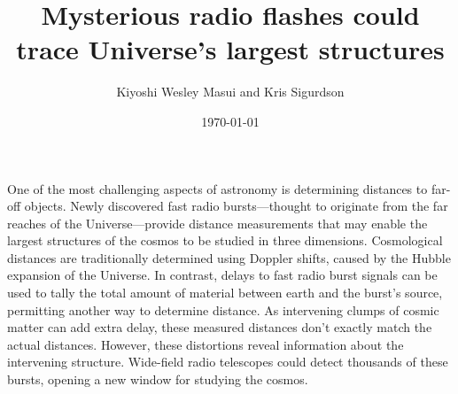 \documentclass{article}
\title{Mysterious radio flashes could trace Universe's largest
structures}
\date{\today}
\author{Kiyoshi Wesley Masui and Kris Sigurdson}
\begin{document}
\maketitle

One of the most challenging aspects of astronomy is determining distances to
far-off objects. Newly discovered fast radio bursts---thought to originate from
the far reaches of the Universe---provide distance measurements that may
enable the largest structures of the cosmos to be studied in three dimensions.
Cosmological distances are traditionally determined using Doppler shifts, caused
by the Hubble expansion of the Universe. In contrast, delays to fast radio
burst signals can be used to tally the total amount of material between earth
and the burst's source, permitting another way to determine distance.
As intervening clumps of cosmic matter can add extra delay, these
measured distances don't exactly match the actual distances.
However, these distortions reveal information about the intervening
structure.
Wide-field radio telescopes could detect thousands of these bursts, opening a
new window for studying the cosmos.
\end{document}
